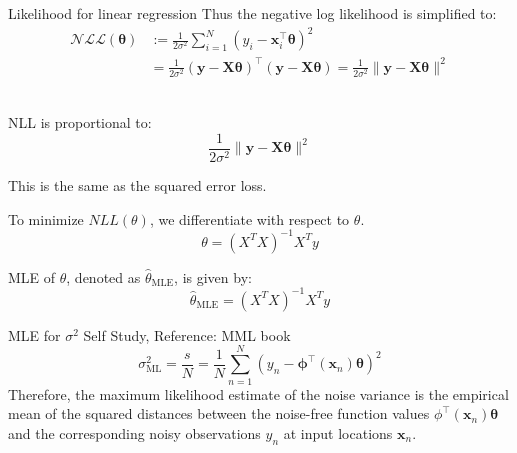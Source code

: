 \documentclass{beamer}
\begin{document}
\begin{frame}{Likelihood for linear regression}
Thus the negative log likelihood is simplified to:
\begin{align*} \mathcal{NLL}(\boldsymbol{\theta}) & :=\frac{1}{2 \sigma^2} \sum_{i=1}^N\left(y_i-\boldsymbol{x}_i^{\top} \boldsymbol{\theta}\right)^2 \\ & =\frac{1}{2 \sigma^2}(\boldsymbol{y}-\boldsymbol{X} \boldsymbol{\theta})^{\top}(\boldsymbol{y}-\boldsymbol{X} \boldsymbol{\theta})=\frac{1}{2 \sigma^2}\|\boldsymbol{y}-\boldsymbol{X} \boldsymbol{\theta}\|^2\end{align*}\\
\pause \begin{tcolorbox}[colback=metropolisblue!5,colframe=metropolisblue,title=Negative Log Likelihood for Linear Regression]     
        NLL is proportional to:
        \begin{equation*}
            \frac{1}{2 \sigma^2}\|\boldsymbol{y}-\boldsymbol{X} \boldsymbol{\theta}\|^2
        \end{equation*}
    \end{tcolorbox}
\pause This is the same as the squared error loss. 
\end{frame}


\begin{frame}
    To minimize $NLL(\theta)$, we differentiate with respect to $\theta$. 
   \pause  \begin{equation}
        \theta = (X^TX)^{-1}X^Ty
    \end{equation}
    \pause \begin{tcolorbox}[colback=metropolisblue!5,colframe=metropolisblue,title=Maximum Likelihood Estimate for $\theta$]
        MLE of $\theta$, denoted as $\hat{\theta}_{\text{MLE}}$, is given by:
        \begin{equation*}
            \hat{\theta}_{\text{MLE}} = (X^TX)^{-1}X^Ty
        \end{equation*}
    \end{tcolorbox}
\end{frame}

\begin{frame}{MLE for $\sigma^2$}
    Self Study, Reference: MML book
    $$
\sigma_{\mathrm{ML}}^2=\frac{s}{N}=\frac{1}{N} \sum_{n=1}^N\left(y_n-\boldsymbol{\phi}^{\top}\left(\boldsymbol{x}_n\right) \boldsymbol{\theta}\right)^2
$$
Therefore, the maximum likelihood estimate of the noise variance is the empirical mean of the squared distances between the noise-free function values $\phi^{\top}\left(\boldsymbol{x}_n\right) \boldsymbol{\theta}$ and the corresponding noisy observations $y_n$ at input locations $\boldsymbol{x}_n$.
    
\end{frame}
\end{document}
